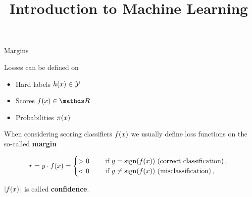 





\newcommand{\titlefigure}{figure_man/optimization_steps.jpeg}
\newcommand{\learninggoals}{
  \item Know advanced classification losses
}

\title{Introduction to Machine Learning}
\date{}







\begin{vbframe}{Margins} 

Losses can be defined on 

\begin{itemize}
  \item Hard labels $h(x) \in \mathcal{Y}$
  \item Scores $\fx \in \R$
  \item Probabilities $\pi(x)$
\end{itemize}

\lz 

When considering scoring classifiers $f(x)$ we usually define loss functions on the so-called \textbf{margin}

$$
r = y\cdot f(x) =  \begin{cases} > 0  \quad &\text{ if } y = \operatorname{sign}(f(x)) \text{ (correct classification)}\,, \\
                      < 0 \quad &\text{ if } y \ne \operatorname{sign}(f(x)) \text{ (misclassification)}\,, \end{cases}
$$

$|f(x)|$ is called \textbf{confidence}.








\end{vbframe}



